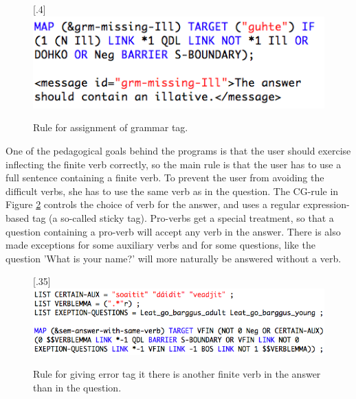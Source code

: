 \documentclass[11pt]{article}
\begin{document}
\begin{figure}[htbp]
\begin{center}
\scalebox{.4}[.4]{\includegraphics{presentation/img/missingIll.png}}\\
\caption{Rule for assignment of grammar tag.}
\label{missingill}
\end{center}
\end{figure}

One of the pedagogical goals behind the programs is that the user should exercise inflecting the finite verb correctly, so the main rule is that the user has to use a full sentence containing a finite verb. To prevent the user from avoiding the difficult verbs, she has to use the same verb as in the question. The CG-rule in Figure \ref{sameverb} controls the choice of verb for the answer, and uses a regular expression-based tag (a so-called sticky tag). Pro-verbs get a special treatment, so that a question containing a pro-verb will accept any verb in the answer. There is also made exceptions for some auxiliary verbs and for some questions, like the question 'What is your name?' will more naturally be answered without a verb. \\


\begin{figure}[htbp]
\begin{center}
\scalebox{.35}[.35]{\includegraphics{presentation/img/verblemma.png}}\\
\caption{Rule for giving error tag it there is another finite verb in the answer than in the question.}
\label{sameverb}
\end{center}
\end{figure}
\end{document}
